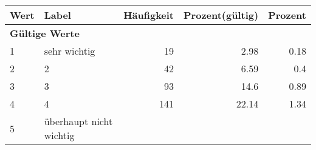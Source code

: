      \begin{longtable}{lXrrr}
     \toprule
     \textbf{Wert} & \textbf{Label} & \textbf{Häufigkeit} & \textbf{Prozent(gültig)} & \textbf{Prozent} \\
     \endhead
     \midrule
     \multicolumn{5}{l}{\textbf{Gültige Werte}}\\

     1 &
     \multicolumn{1}{X}{ sehr wichtig   } &


       \num{19} &
       \num[round-mode=places,round-precision=2]{2.98} &
         \num[round-mode=places,round-precision=2]{0.18} \\

     2 &
     \multicolumn{1}{X}{ 2   } &


       \num{42} &
       \num[round-mode=places,round-precision=2]{6.59} &
         \num[round-mode=places,round-precision=2]{0.4} \\

     3 &
     \multicolumn{1}{X}{ 3   } &


       \num{93} &
       \num[round-mode=places,round-precision=2]{14.6} &
         \num[round-mode=places,round-precision=2]{0.89} \\

     4 &
     \multicolumn{1}{X}{ 4   } &


       \num{141} &
       \num[round-mode=places,round-precision=2]{22.14} &
         \num[round-mode=places,round-precision=2]{1.34} \\

     5 &
     \multicolumn{1}{X}{ überhaupt nicht wichtig   } &



\end{longtable}
